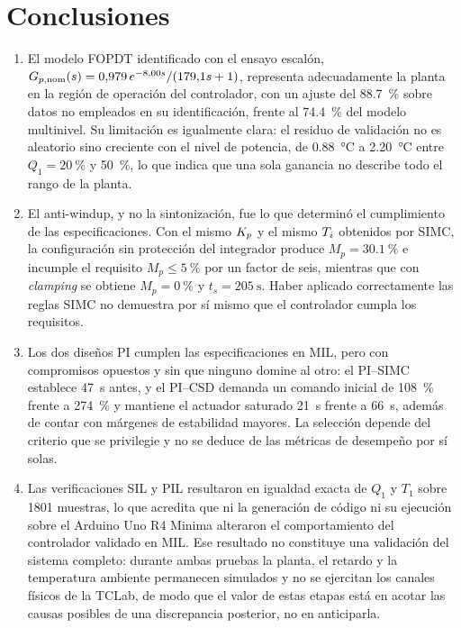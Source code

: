 \section{Conclusiones}

\begin{enumerate}[leftmargin=*]

\item El modelo FOPDT identificado con el ensayo escalón,
$G_{p,\mathrm{nom}}(s) = 0{,}979\,e^{-8{,}00 s}/(179{,}1 s + 1)$, representa adecuadamente la planta en la
región de operación del controlador, con un ajuste del \SI{88.7}{\percent} sobre datos no empleados
en su identificación, frente al \SI{74.4}{\percent} del modelo multinivel. Su limitación es
igualmente clara: el residuo de validación no es aleatorio sino creciente con el nivel de potencia,
de \SI{+0.88}{\celsius} a \SI{+2.20}{\celsius} entre $Q_1 = \SI{20}{\percent}$ y
\SI{50}{\percent}, lo que indica que una sola ganancia no describe todo el rango de la planta.

\item El anti-windup, y no la sintonización, fue lo que determinó el cumplimiento de las
especificaciones. Con el mismo $K_p$ y el mismo $T_i$ obtenidos por SIMC, la configuración sin
protección del integrador produce $M_p = \SI{30.1}{\percent}$ e incumple el requisito
$M_p \leq \SI{5}{\percent}$ por un factor de seis, mientras que con \emph{clamping} se obtiene
$M_p = \SI{0}{\percent}$ y $t_s = \SI{205}{\second}$. Haber aplicado correctamente las reglas SIMC
no demuestra por sí mismo que el controlador cumpla los requisitos.

\item Los dos diseños PI cumplen las especificaciones en MIL, pero con compromisos opuestos y sin
que ninguno domine al otro: el PI--SIMC establece \SI{47}{\second} antes, y el PI--CSD demanda un
comando inicial de \SI{108}{\percent} frente a \SI{274}{\percent} y mantiene el actuador saturado
\SI{21}{\second} frente a \SI{66}{\second}, además de contar con márgenes de estabilidad mayores.
La selección depende del criterio que se privilegie y no se deduce de las métricas de desempeño por
sí solas.

\item Las verificaciones SIL y PIL resultaron en igualdad exacta de $Q_1$ y $T_1$ sobre
\num{1801} muestras, lo que acredita que ni la generación de código ni su ejecución sobre el
Arduino Uno R4 Minima alteraron el comportamiento del controlador validado en MIL. Ese resultado no
constituye una validación del sistema completo: durante ambas pruebas la planta, el retardo y la
temperatura ambiente permanecen simulados y no se ejercitan los canales físicos de la TCLab, de
modo que el valor de estas etapas está en acotar las causas posibles de una discrepancia
posterior, no en anticiparla.


\end{enumerate}
